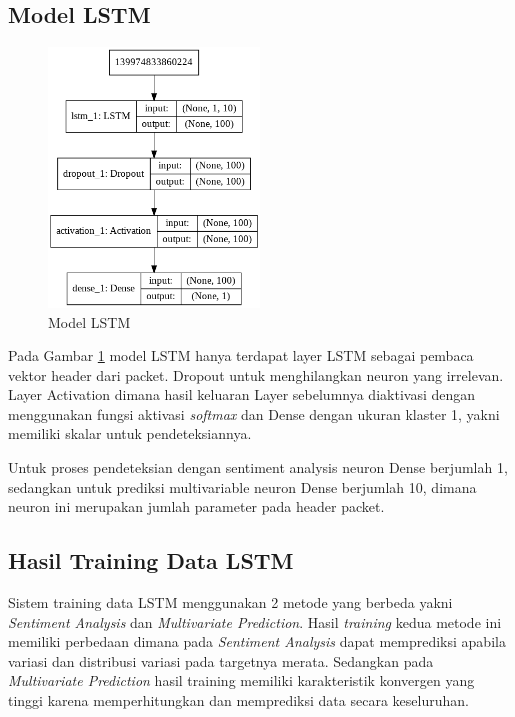 \documentclass[./skripsi.tex]{subfiles}
\begin{document}
\subsection{Model LSTM}
\begin{figure}[H]
    \centering
    \includegraphics[width=0.5\textwidth]{public/assets/img/LSTMModel.png}
    \caption{Model LSTM}
    \label{fig:lstm_model}
\end{figure}
\par Pada Gambar \ref{fig:lstm_model} model LSTM hanya terdapat layer LSTM sebagai pembaca vektor header dari packet. Dropout untuk menghilangkan neuron yang irrelevan. Layer Activation dimana hasil keluaran Layer sebelumnya diaktivasi dengan menggunakan fungsi aktivasi \textit{softmax} dan Dense dengan ukuran klaster 1, yakni memiliki skalar untuk pendeteksiannya.
\par Untuk proses pendeteksian dengan sentiment analysis neuron Dense berjumlah 1, sedangkan untuk prediksi multivariable neuron Dense berjumlah 10, dimana neuron ini merupakan jumlah parameter pada header packet.
\subsection{Hasil Training Data LSTM}
\par Sistem training data LSTM menggunakan 2 metode yang berbeda yakni \textit{Sentiment Analysis} dan \textit{Multivariate Prediction}. Hasil \textit{training} kedua metode ini memiliki perbedaan dimana pada \textit{Sentiment Analysis} dapat memprediksi apabila variasi dan distribusi variasi pada targetnya merata. Sedangkan pada \textit{Multivariate Prediction} hasil training memiliki karakteristik konvergen yang tinggi karena memperhitungkan dan memprediksi data secara keseluruhan.
\end{document}
